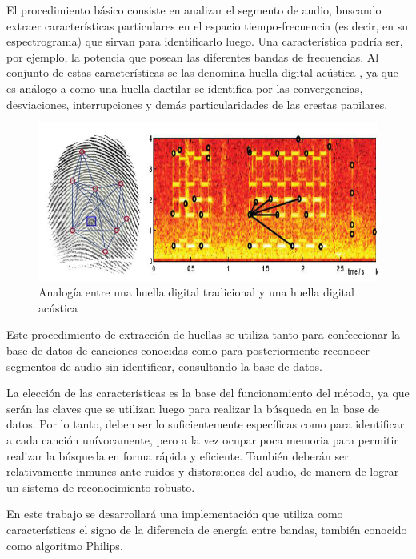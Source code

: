 \documentclass[10pt,spanish,a4paper,openany,notitlepage]{article}
\begin{document}
El procedimiento básico consiste en analizar el segmento de audio, buscando extraer
características particulares en el espacio tiempo-frecuencia (es decir, en su espectrograma)
que sirvan para identificarlo luego. Una característica podría ser, por ejemplo, la potencia
que posean las diferentes bandas de frecuencias. Al conjunto de estas características se las
denomina huella digital acústica , ya que es análogo a como una huella dactilar se identifica
por las convergencias, desviaciones, interrupciones y demás particularidades de las crestas
papilares.

\begin{figure}[H] %
\begin{center}
\includegraphics[scale=0.7]{./imagenes/huella.png}
\caption{Analogía entre una huella digital tradicional y una huella digital acústica}
 \label{fig:ej_huella}
\end{center}
\end{figure}

Este procedimiento de extracción de huellas se utiliza tanto para confeccionar la base de
datos de canciones conocidas como para posteriormente reconocer segmentos de audio sin
identificar, consultando la base de datos.

La elección de las características es la base del funcionamiento del método, ya que serán
las claves que se utilizan luego para realizar la búsqueda en la base de datos. Por lo tanto,
deben ser lo suficientemente específicas como para identificar a cada canción
unívocamente, pero a la vez ocupar poca memoria para permitir realizar la búsqueda en
forma rápida y eficiente. También deberán ser relativamente inmunes ante ruidos y
distorsiones del audio, de manera de lograr un sistema de reconocimiento robusto.

En este trabajo se desarrollará una implementación que utiliza como características el
signo de la diferencia de energía entre bandas, también conocido como algoritmo Philips.
\end{document}
